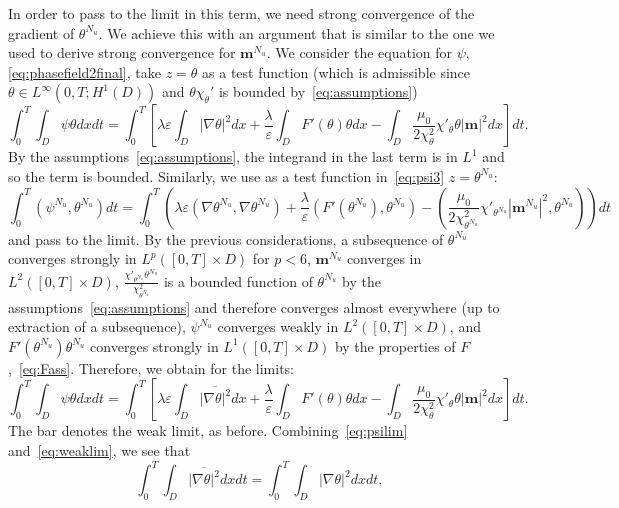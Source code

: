 \documentclass[10pt,letterpaper,twoside]{amsart}
\theoremstyle{definition}{\newtheorem{definition}[lemma]{Definition}}
\theoremstyle{note}{\newtheorem{claim}{Claim}[section]
\newtheorem*{claim*}{Claim}}
\numberwithin{equation}{section}
\newcommand{\dom}{D}
\newcommand{\eps}{\varepsilon}
\newcommand{\Grad}{\nabla}
\newcommand{\bm}{\mathbf{m}}
\begin{document}
 In order to pass to the limit in this term, we need strong convergence of the gradient of $\theta^{N_u}$. We achieve this with an argument that is similar to the one we used to derive strong convergence for $\bm^{N_u}$. 
 We consider the equation for $\psi$, \eqref{eq:phasefield2final}, take  $z=\theta$ as a test function (which is admissible since $\theta\in L^\infty(0,T;H^1(\dom))$ and $\theta \chi_\theta'$ is bounded by~\eqref{eq:assumptions})
 \begin{equation}\label{eq:psilim}
 \int_0^T	\int_{\dom}\psi\theta dxdt  =\int_0^T\left[ \lambda\eps\int_{\dom}|\Grad\theta|^2 dx +\frac{\lambda}{\eps}\int_{\dom} F'(\theta)\theta dx -\int_{\dom}\frac{\mu_0}{2\chi_\theta^2}\chi'_\theta\theta |\bm|^2 dx\right] dt. 
 \end{equation}
 By the assumptions~\eqref{eq:assumptions}, the integrand in the last term is in $L^1$ and so the term is bounded. Similarly, we use as a test function in~\eqref{eq:psi3} $z=\theta^{N_u}$:
 \begin{equation}\label{eq:psilimapprox}
 		\int_0^T(\psi^{N_u},\theta^{N_u})dt =\int_0^T\left(\lambda \eps(\Grad\theta^{N_u},\Grad \theta^{N_u}) +\frac{\lambda}{\eps}(F'(\theta^{N_u}),\theta^{N_u})-\left(\frac{\mu_0}{2\chi_{\theta^{N_u}}^2}\chi'_{\theta^{N_u}}|\bm^{N_u}|^2,\theta^{N_u}\right)\right) dt
 \end{equation}
 and pass to the limit.
 By the previous considerations, a subsequence of $\theta^{N_u}$ converges strongly in $L^p([0,T]\times\dom)$ for $p<6$, $\bm^{N_u}$ converges in $L^2([0,T]\times\dom)$, 
 $\frac{\chi'_{\theta^{N_u}}\theta^{N_u}}{\chi^2_{\theta^{N_u}}}$ is a bounded function of $\theta^{N_u}$ by the assumptions~\eqref{eq:assumptions}
 and therefore converges almost everywhere (up to extraction of a subsequence), $\psi^{N_u}$ converges  weakly in $L^2([0,T]\times\dom)$, and $F'(\theta^{N_u})\theta^{N_u}$ converges strongly in $L^1([0,T]\times\dom)$ by the properties of $F$,~\eqref{eq:Fass}. Therefore, we obtain for the limits:
 \begin{equation}\label{eq:weaklim}
 	\int_0^T\int_{\dom}\psi\theta dxdt  =\int_0^T\left[ \lambda\eps\int_{\dom}\overline{|\Grad\theta|^2} dx +\frac{\lambda}{\eps}\int_{\dom} F'(\theta)\theta dx -\int_{\dom}\frac{\mu_0}{2\chi_\theta^2}\chi'_\theta\theta |\bm|^2 dx\right]dt. 
 \end{equation}
 The bar denotes the weak limit, as before. Combining~\eqref{eq:psilim} and~\eqref{eq:weaklim}, we see that
 \begin{equation}\label{eq:convofnorms}
 	\int_0^T\int_{\dom}\overline{|\Grad\theta|^2} dxdt  = \int_0^T\int_{\dom}|\Grad\theta|^2 dxdt,
 \end{equation}
\end{document}
